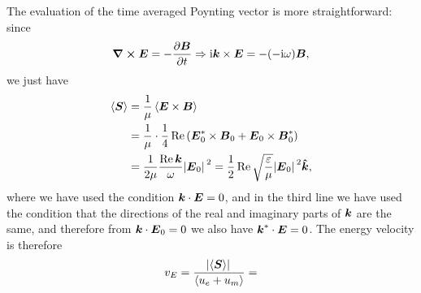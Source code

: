 \documentclass[hyperref, a4paper]{article}
\newcommand*{\ii}{\mathrm{i}}
\begin{document}
The evaluation of the time averaged Poynting vector is more straightforward:
since 
\begin{equation}
    \curl{\vb*{E}} = - \pdv{\vb*{B}}{t} \Rightarrow
    \ii \vb*{k} \times \vb*{E} = - (- \ii \omega) \vb*{B},
\end{equation}
we just have 
\begin{equation}
    \begin{aligned}
        \expval{\vb*{S}} &= \frac{1}{\mu} \expval{\vb*{E} \times \vb*{B}} \\
        &= \frac{1}{\mu} \cdot \frac{1}{4} \Re \left(
            \vb*{E}^*_0 \times \vb*{B}_0 + \vb*{E}_0 \times \vb*{B}^*_0 
        \right) \\
        &= \frac{1}{2 \mu} \frac{\Re \vb*{k}}{\omega} \abs*{\vb*{E}_0}^2
        = \frac{1}{2} \Re \sqrt{\frac{\varepsilon}{\mu}} \abs*{\vb*{E}_0}^2 \vu*{k} ,
    \end{aligned}
\end{equation}
where we have used the condition $\vb*{k} \cdot \vb*{E} = 0$,
and in the third line we have used the condition that 
the directions of the real and imaginary parts of $\vb*{k}$
are the same, and therefore 
from $\vb*{k} \cdot \vb*{E}_0 = 0$ we also have 
$\vb*{k}^* \cdot \vb*{E} = 0$.
The energy velocity is therefore 
\begin{equation}
    v_{E} = \frac{\abs*{\expval{\vb*{S}}}}{\expval{u_e + u_m}}
    = 
\end{equation}
\end{document}
